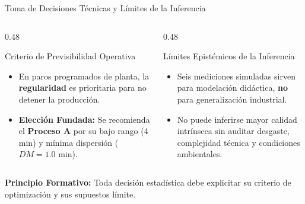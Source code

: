 \documentclass[
	spanish,
	aspectratio=169,
	xcolor={dvipsnames,table}
]{beamer}
\begin{document}
\begin{frame}{Toma de Decisiones Técnicas y Límites de la Inferencia}
\small
\begin{columns}[T]
	\begin{column}{0.48\textwidth}
		\begin{block}{Criterio de Previsibilidad Operativa}
			\begin{itemize}\setlength{\itemsep}{0.1cm}
				\item En paros programados de planta, la \textbf{regularidad} es prioritaria para no detener la producción.
				\item \textbf{Elección Fundada:} Se recomienda el \textbf{Proceso A} por su bajo rango (4 min) y mínima dispersión ($DM = 1.0$ min).
			\end{itemize}
		\end{block}
	\end{column}
	\begin{column}{0.48\textwidth}
		\begin{block}{Límites Epistémicos de la Inferencia}
			\begin{itemize}\setlength{\itemsep}{0.1cm}
				\item Seis mediciones simuladas sirven para modelación didáctica, \textbf{no} para generalización industrial.
				\item No puede inferirse mayor calidad intrínseca sin auditar desgaste, complejidad técnica y condiciones ambientales.
			\end{itemize}
		\end{block}
	\end{column}
\end{columns}
\vspace{0.25cm}
\centering \footnotesize \textcolor{iiiepeNavy}{\textbf{Principio Formativo:} Toda decisión estadística debe explicitar su criterio de optimización y sus supuestos límite.}
\end{frame}
\end{document}
